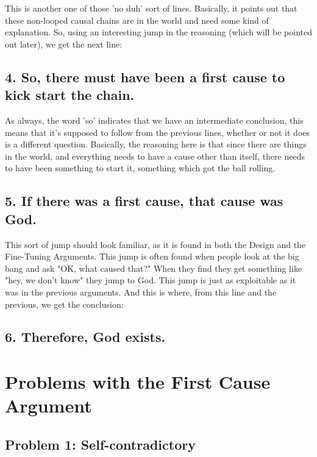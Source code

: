 This is another one of those 'no duh' sort of lines. Basically, it points out that these non-looped causal chains are in the world and need some kind of explanation. So, using an interesting jump in the reasoning (which will be pointed out later), we get the next line:

\subsection{4. So, there must have been a first cause to kick start the chain.}

As always, the word 'so' indicates that we have an intermediate conclusion, this means that it's supposed to follow from the previous lines, whether or not it does is a different question. Basically, the reasoning here is that since there are things in the world, and everything needs to have a cause other than itself, there needs to have been something to start it, something which got the ball rolling. 

\subsection{5. If there was a first cause, that cause was God.}

This sort of jump should look familiar, as it is found in both the Design and the Fine-Tuning Arguments. This jump is often found when people look at the big bang and ask "OK, what caused that?" When they find they get something like "hey, we don't know" they jump to God. This jump is just as exploitable as it was in the previous arguments. And this is where, from this line and the previous, we get the conclusion:

\subsection{6. Therefore, God exists.}

\section{Problems with the First Cause Argument}
\subsection{Problem 1: Self-contradictory}

